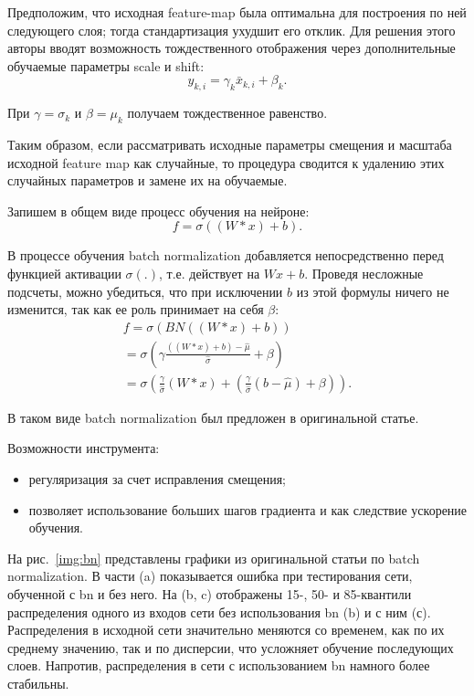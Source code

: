 \documentclass[12pt, specialist, subf, substylefile = spbu.rtx]{disser}
\begin{document}
Предположим, что исходная feature-map была оптимальна для построения по ней следующего слоя; тогда стандартизация ухудшит его отклик. Для решения этого авторы вводят возможность тождественного отображения через дополнительные обучаемые параметры scale и shift:
$$
y_{k,i}=\gamma_k \bar{x}_{k,i} + \beta_k.
$$

При $\gamma = \sigma_k$ и $\beta = \mu_k$ получаем тождественное равенство.

Таким образом, если рассматривать исходные параметры смещения и масштаба исходной feature map как случайные, то процедура сводится к удалению этих случайных параметров и замене их на обучаемые.

Запишем в общем виде процесс обучения на нейроне:
$$
f=\sigma((W*x)+b).
$$

В процессе обучения batch normalization добавляется непосредственно перед функцией активации $\sigma(.)$, т.е. действует на $Wx + b$. Проведя несложные подсчеты, можно убедиться, что при исключении $b$ из этой формулы ничего не изменится, так как ее роль принимает на себя $\beta$:
\begin{gather*}
f=\sigma(BN((W*x)+b))\\=
\sigma(\gamma\frac{((W*x)+b)-\hat{\mu}}{\hat{\sigma}}+\beta)\\= 
\sigma\left(\frac{\gamma}{\hat{\sigma}}(W*x)+\left( \frac{\gamma}{\hat{\sigma}}(b-\hat{\mu}) + \beta \right)\right).
\end{gather*}

В таком виде batch normalization был предложен в оригинальной статье.

Возможности инструмента:
\begin{itemize}
\item регуляризация за счет исправления смещения;
\item позволяет использование больших шагов градиента и как следствие ускорение обучения.
\end{itemize}

На рис.~\ref{img:bn} представлены графики из оригинальной статьи по batch normalization. В части (a) показывается ошибка при тестирования сети, обученной с bn и без него. На (b, c) отображены 15-, 50- и 85-квантили распределения одного из входов сети без использования bn (b) и с ним (с). Распределения в исходной сети значительно меняются со временем, как по их среднему значению, так и по дисперсии, что усложняет обучение последующих слоев. Напротив, распределения в сети с использованием bn намного более стабильны.
\end{document}

